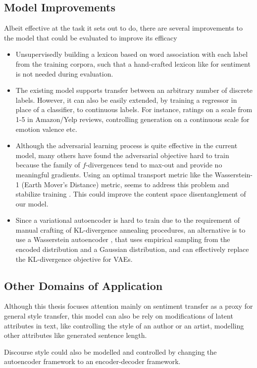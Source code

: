 \subsection{Model Improvements}

Albeit effective at the task it sets out to do, there are several improvements to the model that could be evaluated to improve its efficacy
\begin{itemize}
	\item Unsupervisedly building a lexicon based on word association with each label from the training corpora, such that a hand-crafted lexicon like \cite{hu2004mining} for sentiment is not needed during evaluation.
	\item The existing model supports transfer between an arbitrary number of discrete labels. However, it can also be easily extended, by training a regressor in place of a classifier, to continuous labels. For instance, ratings on a scale from 1-5 in Amazon/Yelp reviews, controlling generation on a continuous scale for emotion valence etc.
	\item Although the adversarial learning process is quite effective in the current model, many others have found the adversarial objective hard to train because the family of $f$-divergences tend to max-out and provide no meaningful gradients. Using an optimal transport metric like the Wasserstein-1 (Earth Mover's Distance) metric, seems to address this problem and stabilize training \citep{arjovsky2017wasserstein, gulrajani2017improved}. This could improve the content space disentanglement of our model.
	\item Since a variational autoencoder is hard to train due to the requirement of manual crafting of KL-divergence annealing procedures, an alternative is to use a Wasserstein autoencoder \citep{tolstikhin2017wasserstein}, that uses empirical sampling from the encoded distribution and a Gaussian distribution, and can effectively replace the KL-divergence objective for VAEs.
\end{itemize}


\subsection{Other Domains of Application}

Although this thesis focuses attention mainly on sentiment transfer as a proxy for general style transfer, this model can also be  rely on modifications of latent attributes in text, like controlling the style of an author or an artist, modelling other attributes like generated sentence length.

Discourse style could also be modelled and controlled by changing the autoencoder framework to an encoder-decoder framework.
